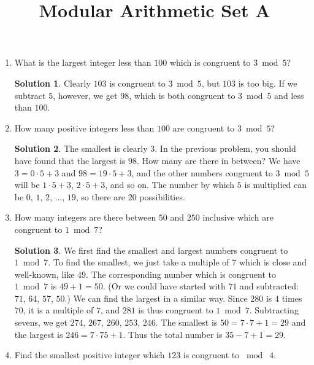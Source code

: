 \documentclass{article}
\title{Modular Arithmetic Set A}
\author{}
\date{}
\theoremstyle{definition}
\newtheorem*{solution}{Solution}
\begin{document}
\maketitle
\begin{multicols}{2}
    \begin{enumerate}
        \item What is the largest integer less than $100$ which is congruent to $3 \bmod 5$?
            \begin{solution}
                Clearly $103$ is congruent to $3 \bmod 5$, but $103$ is too big.
                If we subtract $5$, however, we get $98$, which is both congruent to $3 \bmod 5$ and less than $100$.
            \end{solution}
        \item How many positive integers less than $100$ are congruent to $3\bmod 5$?
            \begin{solution}
                The smallest is clearly $3$.
                In the previous problem, you should have found that the largest is $98$.
                How many are there in between? 
                We have $3 = 0 \cdot 5 + 3$ and $98 = 19 \cdot 5 + 3$, and the other numbers congruent to $3 \bmod 5 $ will be $1 \cdot 5 + 3$, $2 \cdot 5 + 3$, and so on.
                The number by which $5$ is multiplied can be $0$, $1$, $2$, ..., $19$, so there are $20$ possibilities.
            \end{solution}
        \item How many integers are there between $50$ and $250$ inclusive which are congruent to $1\bmod 7$?
            \begin{solution}
                We first find the smallest and largest numbers congruent to $1 \bmod 7$.
                To find the smallest, we just take a multiple of $7$ which is close and well-known, like $49$.
                The corresponding number which is congruent to $1 \bmod 7 $ is $49 + 1 = 50$.
                (Or we could have started with $71$ and subtracted: $71$, $64$, $57$, $50$.) 
                We can find the largest in a similar way.
                Since $280$ is $4$ times $70$, it is a multiple of $7$, and $281$ is thus congruent to $1 \bmod 7$.
                Subtracting sevens, we get $274$, $267$, $260$, $253$, $246$.
                The smallest is $50 = 7 \cdot 7 + 1 = 29$ and the largest is $246 = 7 \cdot 75 + 1$.
                Thus the total number is $35 - 7 + 1 = 29$.
            \end{solution}
        \item Find the smallest positive integer which $123$ is congruent to $\bmod \; 4$.

\end{enumerate}
\end{multicols}
\end{document}
